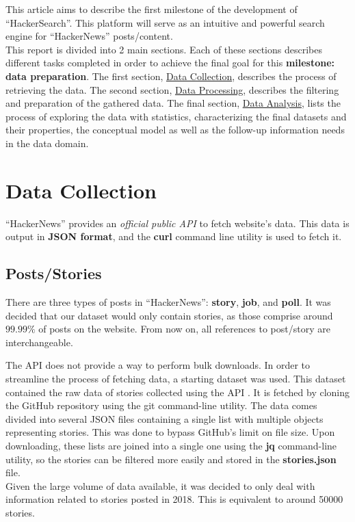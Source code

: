 \documentclass[sigconf]{acmart}
\begin{document}
This article aims to describe the first milestone of the development
of ``HackerSearch''. This platform will serve as an intuitive and
powerful search engine for ``HackerNews'' posts/content.\\
This report is divided into 2 main sections. Each of these sections
describes different tasks completed in order to achieve the final
goal for this \textbf{milestone: data preparation}. The first section,
\hyperref[sec:collection]{Data Collection}, describes the process
of retrieving the data. The second section, 
\hyperref[sec:processing]{Data Processing}, describes the filtering 
and preparation of the gathered data.
The final section, \hyperref[sec:analysis]{Data Analysis}, lists 
the process of exploring the data with statistics, 
characterizing the final datasets and their properties, the conceptual 
model as well as the follow-up information needs in the data domain. 

\section{Data Collection}
\label{sec:collection}
``HackerNews'' provides an \textit{official public API} \cite{API}
to fetch website's data. This data is output in \textbf{JSON format},
and the \textbf{curl} command line utility is used to fetch it.

\subsection{Posts/Stories}
\label{sec:collection_posts}
There are three types of posts in ``HackerNews'': \textbf{story},
\textbf{job}, and \textbf{poll}. It was decided that our dataset
would only contain stories, as those comprise around $99.99\%$ of
posts on the website. From now on, all references to post/story
are interchangeable.

The API \cite{API} does not provide a way to perform bulk downloads. In order
to streamline the process of fetching data, a starting dataset
\cite{githubDataset} was used. This dataset contained the raw data
of stories collected using the API \cite{API}. It is fetched by cloning the
GitHub repository using the git command-line utility. The data
comes divided into several JSON files containing a single list
with multiple objects representing stories. This was done to
bypass GitHub's limit on file size. Upon downloading, these
lists are joined into a single one using the \textbf{jq} \cite{jq}
command-line utility, so the stories can be filtered more easily
and stored in the \textbf{stories.json} file.\\
Given the large volume of data available, it was decided
to only deal with information related to stories posted in
2018. This is equivalent to around 50000 stories.
\end{document}

